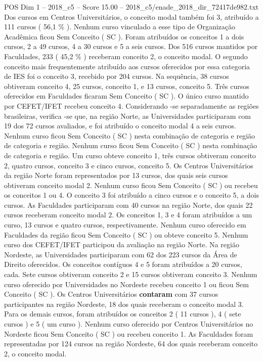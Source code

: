 \begin{textsample}{POS Dim 1 – 2018\_c5 – Score 15.00 – 2018\_c5/enade\_2018\_dir\_72417de982.txt}
Dos cursos em Centros Universitários, o conceito modal também foi 3, atribuído a 111 cursos ( 56,1 \% ).
Nenhum curso vinculado a esse tipo de Organização Acadêmica ficou Sem Conceito ( SC ).
Foram atribuídos os conceitos 1 a dois cursos, 2 a 49 cursos, 4 a 30 cursos e 5 a seis cursos.
Dos 516 cursos mantidos por Faculdades, 233 ( 45,2 \% ) receberam conceito 2, o conceito modal.
O segundo conceito mais frequentemente atribuído aos cursos oferecidos por essa categoria de IES foi o conceito 3, recebido por 204 cursos.
Na sequência, 38 cursos obtiveram conceito 4, 25 cursos, conceito 1, e 13 cursos, conceito 5.
Três cursos oferecidos em Faculdades ficaram Sem Conceito ( SC ).
O único curso mantido por CEFET/IFET recebeu conceito 4.
Considerando -se separadamente as regiões brasileiras, verifica -se que, na região Norte, as Universidades participaram com 19 dos 72 cursos avaliados, e foi atribuído o conceito modal 4 a seis cursos.
Nenhum curso ficou Sem Conceito ( SC ) nesta combinação de categoria e região de categoria e região.
Nenhum curso ficou Sem Conceito ( SC ) nesta combinação de categoria e região.
Um curso obteve conceito 1, três cursos obtiveram conceito 2, quatro cursos, conceito 3 e cinco cursos, conceito 5.
Os Centros Universitários da região Norte foram representados por 13 cursos, dos quais seis cursos obtiveram conceito modal 2.
Nenhum curso ficou Sem Conceito ( SC ) ou recebeu os conceitos 1 ou 4.
O conceito 3 foi atribuído a cinco cursos e o conceito 5, a dois cursos.
As Faculdades participaram com 40 cursos na região Norte, dos quais 22 cursos receberam conceito modal 2.
Os conceitos 1, 3 e 4 foram atribuídos a um curso, 13 cursos e quatro cursos, respectivamente.
Nenhum curso oferecido em Faculdades da região ficou Sem Conceito ( SC ) ou obteve conceito 5.
Nenhum curso dos CEFET/IFET participou da avaliação na região Norte.
Na região Nordeste, as Universidades participaram com 62 dos 223 cursos da Área de Direito oferecidos.
Os conceitos contíguos 4 e 5 foram atribuídos a 20 cursos, cada.
Sete cursos obtiveram conceito 2 e 15 cursos obtiveram conceito 3.
Nenhum curso oferecido por Universidades no Nordeste recebeu conceito 1 ou ficou Sem Conceito ( SC ).
Os Centros Universitários \textbf{contaram} com 37 cursos participantes na região Nordeste, 18 dos quais receberam o conceito modal 3.
Para os demais cursos, foram atribuídos os conceitos 2 ( 11 cursos ), 4 ( sete cursos ) e 5 ( um curso ).
Nenhum curso oferecido por Centros Universitários no Nordeste ficou Sem Conceito ( SC ) ou recebeu conceito 1.
As Faculdades foram representadas por 124 cursos na região Nordeste, 64 dos quais receberam conceito 2, o conceito modal.

\end{textsample}
